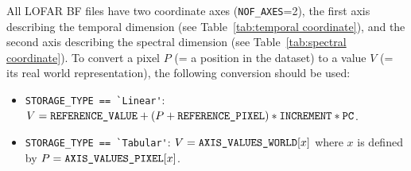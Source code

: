 \documentclass[a4paper,10pt,bibtotoc]{scrartcl}
\begin{document}
All LOFAR BF files have two coordinate axes (\verb|NOF_AXES|=2), the first axis describing the temporal dimension (see Table~\ref{tab:temporal coordinate}), and the second axis describing the spectral dimension (see Table~\ref{tab:spectral coordinate}). To convert a pixel $P$ (= a position in the dataset) to a value $V$ (= its real world representation), the following conversion should be used:
\begin{itemize}
\item \verb|STORAGE_TYPE == `Linear'|: $V = \verb|REFERENCE_VALUE| + (P + \verb|REFERENCE_PIXEL|) * \verb|INCREMENT| * \verb|PC|$.
\item \verb|STORAGE_TYPE == `Tabular'|: $V = \verb|AXIS_VALUES_WORLD|[x]$ where $x$ is defined by $P = \verb|AXIS_VALUES_PIXEL|[x]$.
\end{itemize}
\end{document}
